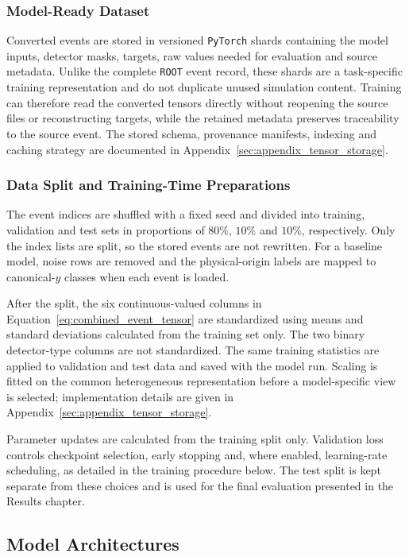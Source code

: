 \subsubsection{Model-Ready Dataset}

Converted events are stored in versioned \texttt{PyTorch} shards containing
the model inputs, detector masks, targets, raw values needed for evaluation
and source metadata. Unlike the complete \texttt{ROOT} event record, these
shards are a task-specific training representation and do not duplicate
unused simulation content. Training can therefore read the converted tensors
directly without reopening the source files or reconstructing targets, while
the retained metadata preserves traceability to the source event. The stored
schema, provenance manifests, indexing and caching strategy are documented in
Appendix~\ref{sec:appendix_tensor_storage}.

\subsubsection{Data Split and Training-Time Preparations}

The event indices are shuffled with a fixed seed and divided into training,
validation and test sets in proportions of \(80\%\), \(10\%\) and \(10\%\),
respectively. Only the index lists are split, so the stored events are not
rewritten.
For a baseline model, noise rows are removed and the physical-origin labels
are mapped to canonical-\(y\) classes when each event is loaded.

After the split, the six continuous-valued columns in
Equation~\eqref{eq:combined_event_tensor} are standardized using means and
standard deviations calculated from the training set only. The two binary
detector-type columns are not standardized. The same training statistics are
applied to validation and test data and saved with the model run. Scaling is
fitted on the common heterogeneous representation before a model-specific
view is selected; implementation details are given in
Appendix~\ref{sec:appendix_tensor_storage}.

Parameter updates are calculated from the training split only. Validation
loss controls checkpoint selection, early stopping and, where enabled,
learning-rate scheduling, as detailed in the training procedure below. The
test split is kept separate from these choices and is used for the final
evaluation presented in the Results chapter.

\subsection{Model Architectures}
\label{sec:method_models}

